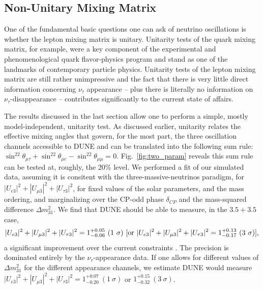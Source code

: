 \documentclass[aps,prd,onecolumn,nofootinbib,superscriptaddress, 11pt]{revtex4}
\begin{document}
\subsection{Non-Unitary Mixing Matrix}
\label{sec:nonunitary}

One of the fundamental basic questions one can ask of neutrino oscillations is whether the lepton mixing matrix is unitary. Unitarity tests of the quark mixing matrix, for example, were a key component of the experimental and phenomenological quark flavor-physics program and stand as one of the landmarks of contemporary particle physics. Unitarity tests of the lepton mixing matrix are still rather unimpressive \cite{Qian:2013ora,Parke:2015goa} and the fact that there is very little direct information concerning $\nu_{\tau}$ appearance -- plus there is literally no information on $\nu_{\tau}$-disappearance -- contributes significantly to the current state of affairs. 

The results discussed in the last section allow one to perform a simple, mostly model-independent, unitarity test. As discussed earlier, unitarity relates the effective mixing angles that govern, for the most part, the three oscillation channels accessible to DUNE and can be translated into the following sum rule: $\sin^22\theta_{\mu\tau}+\sin^22\theta_{\mu e}-\sin^22\theta_{\mu\mu}=0$. Fig.~\ref{fig:two_param} reveals this sum rule can be tested at, roughly, the 20\% level. We performed a fit of our simulated data, assuming it is consitent with the three-massive-neutrinos paradigm, for $|U_{e3}|^2+|U_{\mu3}|^2+|U_{\tau3}|^2$, for fixed values of the solar parameters, and the mass ordering, and marginalizing over the CP-odd phase $\delta_{CP}$ and the mass-squared difference $\Delta m^2_{31}$. We find that DUNE should be able to measure, in the $3.5+3.5$ case,
\begin{equation}
|U_{e3}|^2+|U_{\mu3}|^2+|U_{\tau3}|^2=1^{+0.05}_{-0.06}~(1~\sigma)~[{\rm or}~|U_{e3}|^2+|U_{\mu3}|^2+|U_{\tau3}|^2=1^{+0.13}_{-0.17} ~(3~\sigma)],
\end{equation}
a significant improvement over the current constraints \cite{Parke:2015goa}. The precision is dominated entirely by the $\nu_{\tau}$-appearance data. If one allows for different values of $\Delta m^2_{31}$ for the different appearance channels, we estimate DUNE would measure $|U_{e3}|^2+|U_{\mu3}|^2+|U_{\tau3}|^2=1^{+0.07}_{-0.20}~(1~\sigma)$ or $1^{+0.15}_{-0.32}~(3~\sigma)$. 
\end{document}
